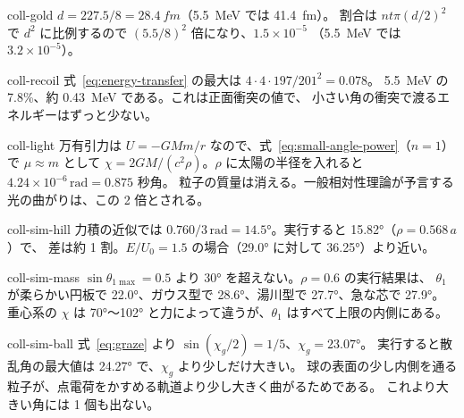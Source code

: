 \begin{solution}{coll-gold}
$d=227.5/8=\qty{28.4}{fm}$（\qty{5.5}{MeV} では \qty{41.4}{fm}）。
割合は $n t\pi(d/2)^2$ で $d^2$ に比例するので $(5.5/8)^2$ 倍になり、$1.5\times10^{-5}$
（\qty{5.5}{MeV} では $3.2\times10^{-5}$）。
\end{solution}

\begin{solution}{coll-recoil}
式~\eqref{eq:energy-transfer} の最大は $4\cdot4\cdot197/201^2=0.078$。
\qty{5.5}{MeV} の 7.8\%、約 \qty{0.43}{MeV} である。これは正面衝突の値で、
小さい角の衝突で渡るエネルギーはずっと少ない。
\end{solution}

\begin{solution}{coll-light}
万有引力は $U=-GMm/r$ なので、式~\eqref{eq:small-angle-power}（$n=1$）で $\mu\approx m$ として
$\chi=2GM/(c^2\rho)$。$\rho$ に太陽の半径を入れると $4.24\times10^{-6}\,\mathrm{rad}=0.875$ 秒角。
粒子の質量は消える。一般相対性理論が予言する光の曲がりは、この 2 倍とされる。
\end{solution}

\begin{solution}{coll-sim-hill}
力積の近似では $0.760/3\,\mathrm{rad}=\ang{14.5}$。実行すると \ang{15.82}（$\rho=0.568\,a$）で、
差は約 1 割。$E/U_0=1.5$ の場合（\ang{29.0} に対して \ang{36.25}）より近い。
\end{solution}

\begin{solution}{coll-sim-mass}
$\sin\theta_{1\max}=0.5$ より \ang{30} を超えない。$\rho=0.6$ の実行結果は、
$\theta_1$ が柔らかい円板で \ang{22.0}、ガウス型で \ang{28.6}、湯川型で \ang{27.7}、急な芯で \ang{27.9}。
重心系の $\chi$ は \ang{70}〜\ang{102} と力によって違うが、$\theta_1$ はすべて上限の内側にある。
\end{solution}

\begin{solution}{coll-sim-ball}
式~\eqref{eq:graze} より $\sin(\chi_g/2)=1/5$、$\chi_g=\ang{23.07}$。
実行すると散乱角の最大値は \ang{24.27} で、$\chi_g$ より少しだけ大きい。
球の表面の少し内側を通る粒子が、点電荷をかすめる軌道より少し大きく曲がるためである。
これより大きい角には 1 個も出ない。
\end{solution}
